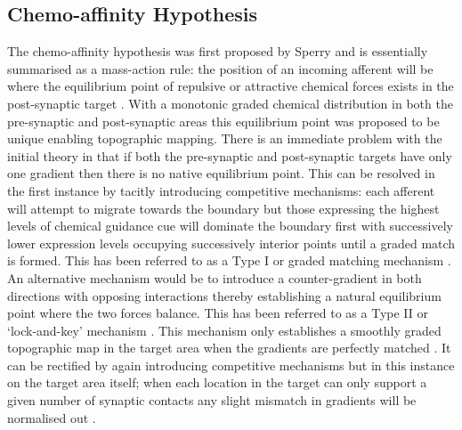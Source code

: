 \subsection{Chemo-affinity Hypothesis \label{section:chemohypothesis}}
The chemo-affinity hypothesis was first proposed by Sperry and is essentially summarised as a mass-action rule: the position of an incoming afferent will be where the equilibrium point of repulsive or attractive chemical forces exists in the post-synaptic target \cite{Sperry1963-jc}. With a monotonic graded chemical distribution in both the pre-synaptic and post-synaptic areas this equilibrium point was proposed to be unique enabling topographic mapping. There is an immediate problem with the initial theory in that if both the pre-synaptic and post-synaptic targets have only one gradient then there is no native equilibrium point. This can be resolved in the first instance by tacitly introducing competitive mechanisms: each afferent will attempt to migrate towards the boundary but those expressing the highest levels of chemical guidance cue will dominate the boundary first with successively lower expression levels occupying successively interior points until a graded match is formed. This has been referred to as a Type I or graded matching mechanism \cite{Hjorth2015-le}. An alternative mechanism would be to introduce a counter-gradient in both directions with opposing interactions thereby establishing a natural equilibrium point where the two forces balance. This has been referred to as a Type II or `lock-and-key' mechanism \cite{Hjorth2015-le}. This mechanism only establishes a smoothly graded topographic map in the target area when the gradients are perfectly matched \cite{Gierer1983-rm, Sterratt2013-ev}. It can be rectified by again introducing competitive mechanisms but in this instance on the target area itself; when each location in the target can only support a given number of synaptic contacts any slight mismatch in gradients will be normalised out \cite{Sterratt2013-ev, Prestige1975-vh}.

